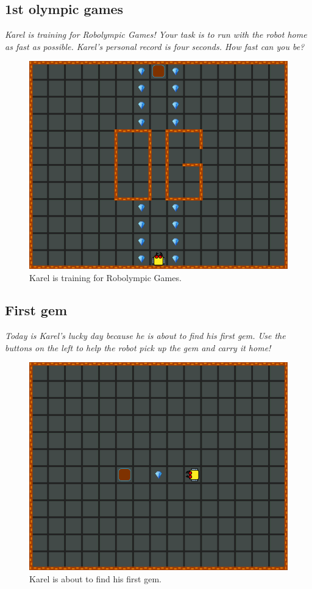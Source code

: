 \newpage
\subsection{1st olympic games}

{\em Karel is training for Robolympic Games! Your task is to run with 
the robot home as fast as possible. Karel's personal record is four seconds. How fast can you be?}

\begin{figure}[!ht]
\begin{center}
\includegraphics[height=0.4\textwidth]{img/a02.png}
\end{center}
\vspace{-4mm}
\caption{Karel is training for Robolympic Games.}
\label{fig:a02}
\vspace{-4mm}
\end{figure}
\noindent

\subsection{First gem}

{\em Today is Karel's lucky day because he is about to find his first gem. 
Use the buttons on the left to help the robot pick up the gem and carry it 
home!}

\begin{figure}[!ht]
\begin{center}
\includegraphics[height=0.4\textwidth]{img/a03.png}
\end{center}
\vspace{-4mm}
\caption{Karel is about to find his first gem.}
\label{fig:a03}
\vspace{-1cm}
\end{figure}
\noindent

